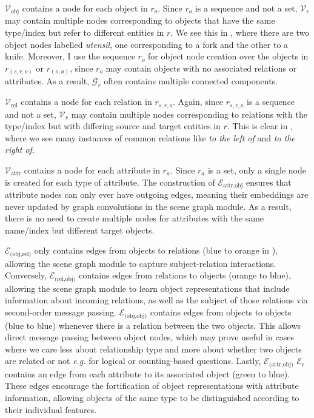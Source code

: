 \(\mathcal{V}_\text{obj}\) contains a node for each object in \(r_o\). Since \(r_o\) is a sequence and not a set, \(\mathcal{V}_v\) may contain multiple nodes corresponding to objects that have the same type/index but refer to different entities in \(r\). We see this in \figureautorefname{ \ref{fig:scene_graph_construction}}, where there are two object nodes labelled \textit{utensil}, one corresponding to a fork and the other to a knife. Moreover, I use the sequence \(r_o\) for object node creation over the objects in \(r_{(s, r, o)}\) or \(r_{(o, a)}\), since \(r_o\) may contain objects with no associated relations or attributes. As a result, \(\mathcal{G}_r\) often contains multiple connected components.

\(\mathcal{V}_\text{rel}\) contains a node for each relation in \(r_{s, r, o}\). Again, since \(r_{s, r, o}\) is a sequence and not a set, \(\mathcal{V}_v\) may contain multiple nodes corresponding to relations with the type/index but with differing source and target entities in \(r\). This is clear in \figureautorefname{ \ref{fig:scene_graph_construction}}, where we see many instances of common relations like \textit{to the left of} and \textit{to the right of}.

\(\mathcal{V}_\text{attr}\) contains a node for each attribute in \(r_a\). Since \(r_a\) is a set, only a single node is created for each type of attribute. The construction of \(\mathcal{E}_\text{attr,obj}\) ensures that attribute nodes can only ever have outgoing edges, meaning their embeddings are never updated by graph convolutions in the scene graph module. As a result, there is no need to create multiple nodes for attributes with the same name/index but different target objects.

\(\mathcal{E}_{\text{(obj,rel)}}\) only contains edges from objects to relations (blue to orange in \figureautorefname{ \ref{fig:scene_graph_construction}}), allowing the scene graph module to capture subject-relation interactions. Conversely, \(\mathcal{E}_{\text{(rel,obj)}}\) contains edges from relations to objects (orange to blue), allowing the scene graph module to learn object representations that include information about incoming relations, as well as the subject of those relations via second-order message passing. \(\mathcal{E}_{\text{(obj,obj)}}\) contains edges from objects to objects (blue to blue) whenever there is a relation between the two objects. This allows direct message passing between object nodes, which may prove useful in cases where we care less about relationship type and more about whether two objects are related or not \textit{e.g.} for logical or counting-based questions. Lastly, \(\mathcal{E}_{\text{(attr,obj)}}\) \(\mathcal{E}_r\) contains an edge from each attribute to its associated object (green to blue). These edges encourage the fortification of object representations with attribute information, allowing objects of the same type to be distinguished according to their individual features.

